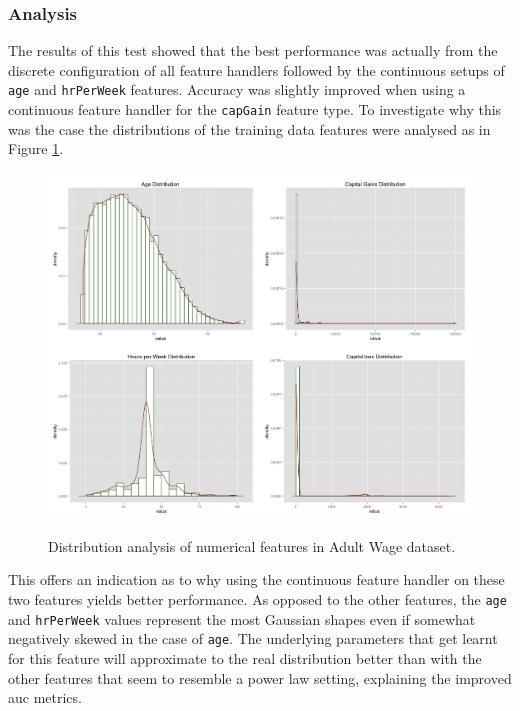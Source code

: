 \documentclass[a4paper,11pt]{scrreprt}
\begin{document}
\subsubsection{Analysis}
The results of this test showed that the best performance was actually from the discrete configuration of all feature handlers followed by the continuous setups of \verb|age| and \verb|hrPerWeek| features. Accuracy was slightly improved when using a continuous feature handler for the \verb|capGain| feature type. To investigate why this was the case the distributions of the training data features were analysed as in Figure \ref{fig:adultwagefeaturedist}. 
\begin{figure}[h!]
\centering
\caption{Distribution analysis of numerical features in Adult Wage dataset.}
\includegraphics[scale=0.37, trim=0 0 0 0, clip=true] {AdultWageFeatureDistributions.png}
\label{fig:adultwagefeaturedist}
\end{figure}

This offers an indication as to why using the continuous feature handler on these two features yields better performance. As opposed to the other features, the \verb|age| and \verb|hrPerWeek| values represent the most Gaussian shapes even if somewhat negatively skewed in the case of \verb|age|. The underlying parameters that get learnt for this feature will approximate to the real distribution better than with the other features that seem to resemble a power law setting, explaining the improved \acrshort{auc} metrics.\\
\end{document}
